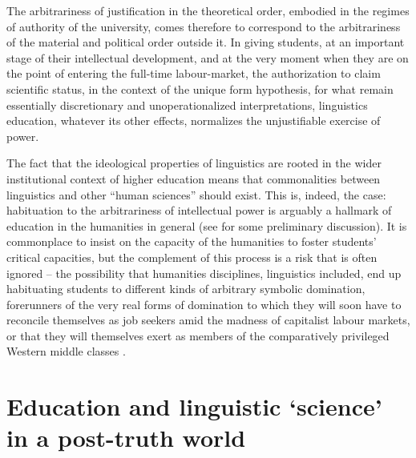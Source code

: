\documentclass[output=paper]{langscibook}
\begin{document}
The arbitrariness of justification in the theoretical order, embodied in the regimes of authority of the university, comes therefore to correspond to the arbitrariness of the material and political order outside it. In giving students, at an important stage of their intellectual development, and at the very moment when they are on the point of entering the full-time labour-market, the authorization to claim scientific status, in the context of the unique form hypothesis, for what remain essentially discretionary and unoperationalized interpretations, linguistics education, whatever its other effects, normalizes the unjustifiable exercise of power.

The fact that the ideological properties of linguistics are rooted in the wider institutional context of higher education means that commonalities between linguistics and other ``human sciences'' should exist. This is, indeed, the case: habituation to the arbitrariness of intellectual power is arguably a hallmark of education in the humanities in general (see \citealt{Riemer2016} for some preliminary discussion). It is commonplace to insist on the capacity of the humanities to foster students' critical capacities, but the complement of this process is a risk that is often ignored – the possibility that humanities disciplines, linguistics included, end up habituating students to different kinds of arbitrary symbolic domination, forerunners of the very real forms of domination to which they will soon have to reconcile themselves as job seekers amid the madness of capitalist labour markets, or that they will themselves exert as members of the comparatively privileged Western middle classes \citep[see][]{Pinsker2015}.

\section{Education and linguistic ‘science’ in a post-truth world}
\label{sec:riemer:education}
\end{document}
